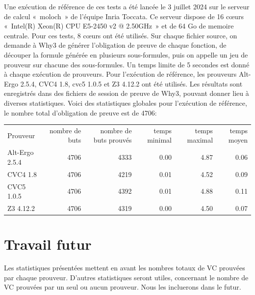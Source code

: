 \documentclass[a4paper,11pt]{article}
\begin{document}
Une exécution de référence de ces tests a été lancée le 3 juillet 2024
sur le serveur de calcul «~moloch~» de l'équipe Inria Toccata. Ce
serveur dispose de 16 c{\oe}urs «~Intel(R) Xeon(R) CPU E5-2450 v2 @
2.50GHz~» et de 64 Go de memoire centrale. Pour ces tests, 8 c{\oe}urs
ont été utilisés. Sur chaque fichier source, on demande à Why3 de
générer l'obligation de preuve de chaque fonction, de découper la
formule générée en plusieurs sous-formules, puis on appelle un jeu de
prouveur sur chacune des sous-formules. Un temps limite de 5 secondes est donné à chaque exécution de prouveurs. Pour l'exécution de référence,
les prouveurs Alt-Ergo 2.5.4, CVC4 1.8, cvc5 1.0.5 et Z3 4.12.2 ont
été utilisés. Les résultats sont enregistrés dans des fichiers de
session de preuve de Why3, pouvant donner lieu à diverses
statistiques. Voici des statistiques globales pour l'exécution de
référence, le nombre total d'obligation de preuve est de 4706:
\begin{center}
  \begin{tabular}{|l|r|r|r|r|r|}
    \hline
  \rowcolor{gray!50} Prouveur
  & \multicolumn{1}{p{0.13\textwidth}|}{nombre de buts}
  & \multicolumn{1}{p{0.13\textwidth}|}{nombre de buts prouvés}
  & \multicolumn{1}{p{0.13\textwidth}|}{temps minimal}
  & \multicolumn{1}{p{0.13\textwidth}|}{temps maximal}
  & \multicolumn{1}{p{0.13\textwidth}|}{temps moyen}
  \\
  Alt-Ergo 2.5.4                &  4706  & 4333   & 0.00  & 4.87  & 0.06 \\
  CVC4 1.8                      &  4706  & 4219   & 0.01  & 4.52  & 0.09 \\
  CVC5 1.0.5                    &  4706  & 4392   & 0.01  & 4.88  & 0.11 \\
  Z3 4.12.2                     &  4706  & 4319   & 0.00  & 4.50  & 0.07 \\
  \hline
\end{tabular}
\end{center}



\section{Travail futur}

Les statistiques présentées mettent en avant les nombres totaux de VC prouvées
par chaque prouveur. D'autres statistiques seront utiles, concernant le nombre
de VC prouvées par un seul ou aucun prouveur. Nous les incluerons dans le futur.
\end{document}
